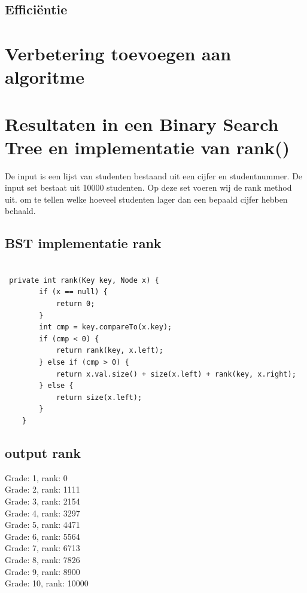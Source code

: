 \documentclass[12pt,notitlepage]{article}
\begin{document}
\subsection{Efficiëntie}




\section{Verbetering toevoegen aan algoritme}

\section{Resultaten in een Binary Search Tree en implementatie van rank()}

De input is een lijst van studenten bestaand uit een cijfer en studentnummer. De input set bestaat uit 10000 studenten. Op deze set  voeren wij de rank method uit. om te tellen welke hoeveel studenten lager dan een bepaald cijfer hebben behaald. \\


\subsection{BST implementatie rank}

\begin{lstlisting}

 private int rank(Key key, Node x) {
        if (x == null) {
            return 0;
        }
        int cmp = key.compareTo(x.key);
        if (cmp < 0) {
            return rank(key, x.left);
        } else if (cmp > 0) {
            return x.val.size() + size(x.left) + rank(key, x.right);
        } else {
            return size(x.left);
        }
    }
\end{lstlisting}
\subsection{output rank}
Grade: 1, rank: 0 \\
Grade: 2, rank: 1111 \\
Grade: 3, rank: 2154 \\
Grade: 4, rank: 3297 \\
Grade: 5, rank: 4471 \\
Grade: 6, rank: 5564 \\
Grade: 7, rank: 6713 \\
Grade: 8, rank: 7826 \\
Grade: 9, rank: 8900 \\
Grade: 10, rank: 10000
\end{document}
